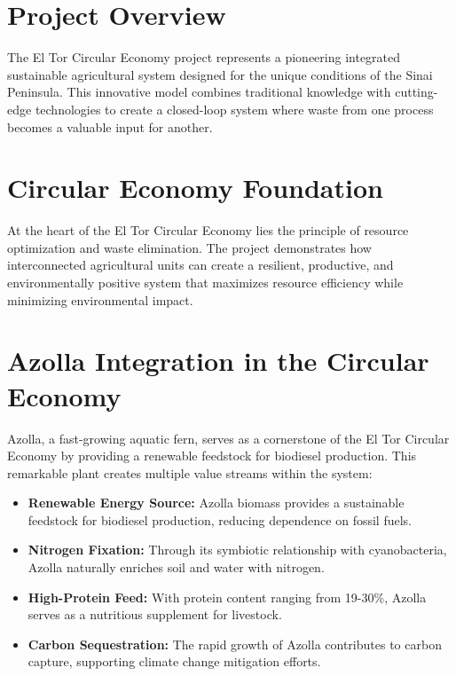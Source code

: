 \section{Project Overview}

The El Tor Circular Economy project represents a pioneering integrated sustainable agricultural system designed for the unique conditions of the Sinai Peninsula. This innovative model combines traditional knowledge with cutting-edge technologies to create a closed-loop system where waste from one process becomes a valuable input for another.

\section{Circular Economy Foundation}

At the heart of the El Tor Circular Economy lies the principle of resource optimization and waste elimination. The project demonstrates how interconnected agricultural units can create a resilient, productive, and environmentally positive system that maximizes resource efficiency while minimizing environmental impact.

\section{Azolla Integration in the Circular Economy}

Azolla, a fast-growing aquatic fern, serves as a cornerstone of the El Tor Circular Economy by providing a renewable feedstock for biodiesel production. This remarkable plant creates multiple value streams within the system:

\begin{itemize}
    \item \textbf{Renewable Energy Source:} Azolla biomass provides a sustainable feedstock for biodiesel production, reducing dependence on fossil fuels.
    \item \textbf{Nitrogen Fixation:} Through its symbiotic relationship with cyanobacteria, Azolla naturally enriches soil and water with nitrogen.
    \item \textbf{High-Protein Feed:} With protein content ranging from 19-30\%, Azolla serves as a nutritious supplement for livestock.
    \item \textbf{Carbon Sequestration:} The rapid growth of Azolla contributes to carbon capture, supporting climate change mitigation efforts.
\end{itemize}

